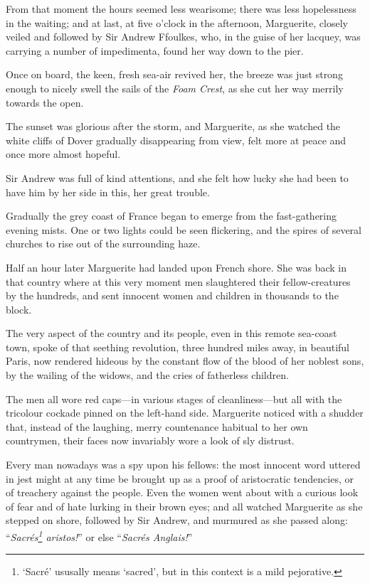 \documentclass[paper=5.5in:8.5in,BCOR=7mm,twoside,DIV=calc,12pt,usegeometry,chapterprefix,endperiod,headings=big]{scrbook}
\begin{document}
From that moment the hours seemed less wearisome; there was less hopelessness in the waiting; and at last, at five o'clock in the afternoon, Marguerite, closely veiled and followed by Sir Andrew Ffoulkes, who, in the guise of her lacquey, was carrying a number of impedimenta, found her way down to the pier.

Once on board, the keen, fresh sea-air revived her, the breeze was just strong enough to nicely swell the sails of the \textit{Foam Crest}, as she cut her way merrily towards the open.

The sunset was glorious after the storm, and Marguerite, as she watched the white cliffs of Dover gradually disappearing from view, felt more at peace and once more almost hopeful.

Sir Andrew was full of kind attentions, and she felt how lucky she had been to have him by her side in this, her great trouble.

Gradually the grey coast of France began to emerge from the fast-gathering evening mists. One or two lights could be seen flickering, and the spires of several churches to rise out of the surrounding haze.

Half an hour later Marguerite had landed upon French shore. She was back in that country where at this very moment men slaughtered their fellow-creatures by the hundreds, and sent innocent women and children in thousands to the block.

The very aspect of the country and its people, even in this remote sea-coast town, spoke of that seething revolution, three hundred miles away, in beautiful Paris, now rendered hideous by the constant flow of the blood of her noblest sons, by the wailing of the widows, and the cries of fatherless children.

The men all wore red caps---in various stages of \newline cleanliness---but all with the tricolour cockade pinned on the left-hand side. Marguerite noticed with a shudder that, instead of the laughing, merry countenance habitual to her own countrymen, their faces now invariably wore a look of sly distrust.

Every man nowadays was a spy upon his fellows: the most innocent word uttered in jest might at any time be brought up as a proof of aristocratic tendencies, or of treachery against the people. Even the women went about with a curious look of fear and of hate lurking in their brown eyes; and all watched Marguerite as she stepped on shore, followed by Sir Andrew, and murmured as she passed along: \enquote{\textit{Sacrés\footnote{\enquote{Sacré} ususally means \enquote{sacred}, but in this context is a mild pejorative.} aristos!}} or else \enquote{\textit{Sacrés Anglais!}}
\end{document}
